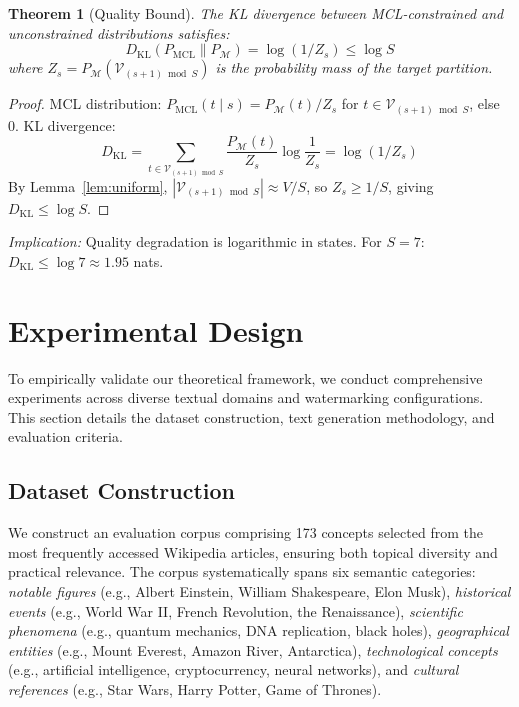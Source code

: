 \documentclass[11pt]{article}
\newtheorem{theorem}{Theorem}[section]
\theoremstyle{definition}
\theoremstyle{remark}
\begin{document}
\begin{theorem}[Quality Bound]
\label{thm:quality}
The KL divergence between MCL-constrained and unconstrained distributions satisfies:
$$D_{\text{KL}}(P_{\text{MCL}} \| P_{\mathcal{M}}) = \log(1/Z_s) \leq \log S$$
where $Z_s = P_{\mathcal{M}}(\mathcal{V}_{(s+1) \bmod S})$ is the probability mass of the target partition.
\end{theorem}

\begin{proof}
MCL distribution: $P_{\text{MCL}}(t \mid s) = P_{\mathcal{M}}(t)/Z_s$ for $t \in \mathcal{V}_{(s+1) \bmod S}$, else 0. KL divergence:
$$D_{\text{KL}} = \sum_{t \in \mathcal{V}_{(s+1) \bmod S}} \frac{P_{\mathcal{M}}(t)}{Z_s} \log \frac{1}{Z_s} = \log(1/Z_s)$$
By Lemma~\ref{lem:uniform}, $|\mathcal{V}_{(s+1) \bmod S}| \approx V/S$, so $Z_s \geq 1/S$, giving $D_{\text{KL}} \leq \log S$.
\end{proof}

\noindent
\textit{Implication:} Quality degradation is logarithmic in states. For $S=7$: $D_{\text{KL}} \leq \log 7 \approx 1.95$ nats.

\section{Experimental Design}

To empirically validate our theoretical framework, we conduct comprehensive experiments across diverse textual domains and watermarking configurations. This section details the dataset construction, text generation methodology, and evaluation criteria.

\subsection{Dataset Construction}

We construct an evaluation corpus comprising 173 concepts selected from the most frequently accessed Wikipedia articles, ensuring both topical diversity and practical relevance. The corpus systematically spans six semantic categories: \textit{notable figures} (e.g., Albert Einstein, William Shakespeare, Elon Musk), \textit{historical events} (e.g., World War II, French Revolution, the Renaissance), \textit{scientific phenomena} (e.g., quantum mechanics, DNA replication, black holes), \textit{geographical entities} (e.g., Mount Everest, Amazon River, Antarctica), \textit{technological concepts} (e.g., artificial intelligence, cryptocurrency, neural networks), and \textit{cultural references} (e.g., Star Wars, Harry Potter, Game of Thrones).
\end{document}
